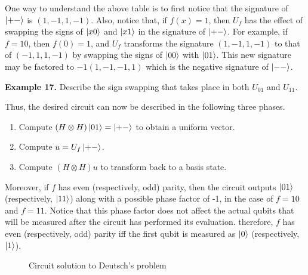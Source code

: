 \documentclass [12pt]{article}
\theoremstyle{definition}
\begin{document}
One way to understand the above table is to first notice that the signature of $\ket{+-}$ is $(1,-1,1,-1)$. Also,
 notice that, if $f(x)=1$, then $U_f$ has the effect of swapping the signs of $\ket{x0}$ and $\ket{x1}$ in the signature
of $\ket{+-}$. For example, if $f=10$, then $f(0)=1$, and $U_f$ transforms the signature $(1,-1,1,-1)$ to that of $(-1,1,1,-1)$ by swapping the signs of
$\ket{00}$ with $\ket{01}$. This new signature may be factored to $-1(1,-1,-1,1)$ which is the negative signature of $\ket{--}$. 

\newpage
\textbf{Example 17.} Describe the sign swapping that takes place in both $U_{01}$ and $U_{11}$.


\newpage
\vspace{4.0in}
Thus, the desired circuit can now be described in the following three phases.
\begin{enumerate}
\item Compute $(H\otimes H)\ket{01}=\ket{+-}$ to obtain a uniform vector.
\item  Compute $u=U_f\ket{+-}$.
\item Compute $(H\otimes H)u$ to transform back to a basis state.
\end{enumerate}
Moreover, if $f$ has even (respectively, odd) parity, then the circuit outputs $\ket{01}$ (respectively, $\ket{11}$) along with a possible phase factor of -1, in the case
of $f=10$ and $f=11$. Notice that this phase factor does not affect the actual qubits that will be measured after the circuit has performed its evaluation. 
therefore, $f$ has even (respectively, odd) parity iff the first qubit is measured as $\ket{0}$ (respectively, $\ket{1}$).

\begin{figure}
\begin{center}
\end{center}
\caption{Circuit solution to Deutsch's problem}
\end{figure}
\end{document}
